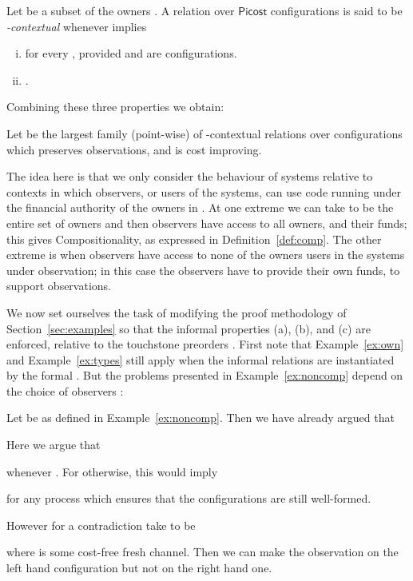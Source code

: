 \documentclass{LMCS}
\newcommand{\pfn}[1]{\mathsf{#1}}  \newcommand{\cfn}[1]{\mathsf{#1}}  \newcommand{\ownfnt}[1]{{\mathsf{#1}}}
\newcommand{\picost}{\ensuremath{\pfn{Picost}}\xspace}
\newcommand{\EndDefBox}{\null\hfill}
\newcommand{\boxHere}{\global\let\EndProof\empty\EndDefBox}
\begin{document}
\begin{defi}[-contextual]\label{def:contextual}
Let  be a subset of the owners . A relation 
 over \picost configurations is said to be 
\emph{-contextual} whenever
  implies 
\begin{enumerate}[(i)]
\item 
 for every 
 , provided 
 and  are configurations. 

\item .
\boxHere
\end{enumerate}
\end{defi}


\noindent
Combining these three properties we obtain:
\begin{defi}\label{def:cxtequiv}
  Let  be the largest family (point-wise) of 
   -contextual relations
  over configurations which preserves observations, and is  cost
  improving.\boxHere
\end{defi}
The idea here is that we only consider the behaviour of systems
relative to contexts in which observers, or users of the systems, can
use code running under the financial authority of the owners in
. At one extreme we can take  to be the entire set of
owners  and then observers have access to all owners, and
their funds; this gives Compositionality, as expressed in Definition~\ref{def:comp}. 
The other extreme is when observers have access to
none of the owners users in the systems under observation; in this
case the observers have to provide their own funds, to support
observations. 


We now set ourselves the task of modifying the proof methodology of
Section~\ref{sec:examples} so that the informal properties (a), (b), and (c) are
enforced, relative to the touchstone preorders .
First note that Example~\ref{ex:own} and
Example~\ref{ex:types} still apply when the informal relations
 are instantiated by the formal . But the problems 
presented in 
Example~\ref{ex:noncomp} depend on the choice of observers :

\begin{exa}[Unsoundness]\label{ex:unsound}
  Let  be as defined in Example~\ref{ex:noncomp}. Then we have already argued that

Here we argue that 

whenever . 
For otherwise, this would imply

for any process   which ensures that the configurations are still well-formed.  

However for a contradiction take  to be 

where  is some cost-free fresh channel. 
Then we can make the observation  on the left hand configuration but not on the
right hand one. 
\boxHere
\end{exa}
\end{document}
